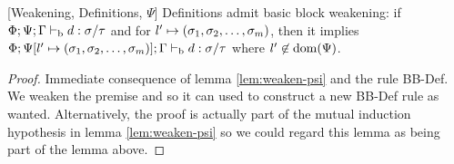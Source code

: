 \documentclass[a4paper, oneside, 10pt, final]{memoir}
\begin{document}
\begin{lem}{[Weakening, Definitions, $\Psi$]}
  \label{lem:weaken-psi-d}
  Definitions admit basic block weakening: if $\Phi;\Psi;\Gamma |-_{\mathrm{b}} d
  : \sigma / \tau$ and for $l' \mapsto (\sigma_1, \sigma_2, \dotsc, \sigma_m)$, then it implies
  $\Phi;\Psi[l' \mapsto (\sigma_1, \sigma_2, \dotsc, \sigma_m)];\Gamma |-_{\mathrm{b}} d : \sigma / \tau$ where
  $l' \not \in \mathrm{dom}(\Psi)$.
\end{lem}
\begin{proof}
  Immediate consequence of lemma \ref{lem:weaken-psi} and the rule
  BB-Def. We weaken the premise and so it can used to construct a
  new BB-Def rule as wanted. Alternatively, the proof is actually part
  of the mutual induction hypothesis in lemma \ref{lem:weaken-psi} so we
  could regard this lemma as being part of the lemma above.
\end{proof}
\end{document}
